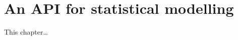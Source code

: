 
\inbpdocument

\chapter{An API for statistical modelling}
\label{ch:api}

This chapter\dots

\outbpdocument{


}
